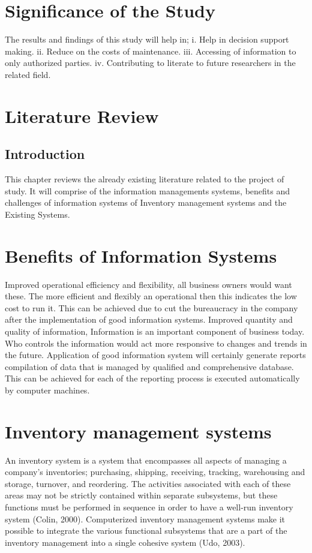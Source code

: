 \documentclass[options]{article}
\begin{document}
\section{\textbf{Significance of the Study}}
The results and findings of this study will help in; 
i.	Help in decision support making.
ii.	Reduce on the costs of maintenance.
iii.	Accessing of information to only authorized parties.
iv.	Contributing to literate to future researchers in the related field.
\section{\textbf{Literature Review}}
\subsection{\textbf{ Introduction}}
This chapter reviews the already existing literature related to the project of study. It will comprise of the information managements systems, benefits and challenges of information systems of Inventory management systems and the Existing Systems.
\section{\textbf{Benefits of Information Systems}}
Improved operational efficiency and flexibility, all business owners would want these. The more efficient and flexibly an operational then this indicates the low cost to run it. This can be achieved due to cut the bureaucracy in the company after the implementation of good information systems.
Improved quantity and quality of information, Information is an important component of business today. Who controls the information would act more responsive to changes and trends in the future. Application of good information system will certainly generate reports compilation of data that is managed by qualified and comprehensive database. This can be achieved for each of the reporting process is executed automatically by computer machines.
\section{\textbf{ Inventory management systems}}
An inventory system is a system that encompasses all aspects of managing a company's inventories; purchasing, shipping, receiving, tracking, warehousing and storage, turnover, and reordering. The activities associated with each of these areas may not be strictly contained within separate subsystems, but these functions must be performed in sequence in order to have a well-run inventory system (Colin, 2000). Computerized inventory management systems make it possible to integrate the various functional subsystems that are a part of the inventory management into a single cohesive system (Udo, 2003).
\end{document}
